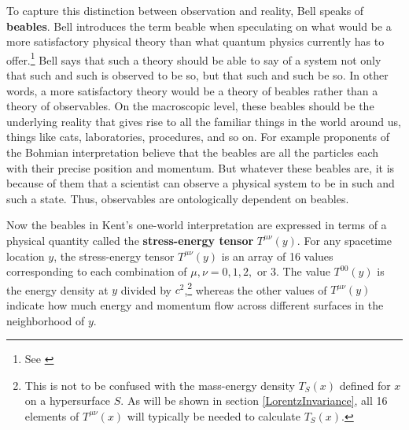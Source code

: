 \documentclass[12pt]{report}
\begin{document}
To capture this distinction between observation and reality, Bell speaks of \textbf{beables}.\label{beabledef} Bell introduces the term beable when speculating on what would be a more satisfactory physical theory than what quantum physics currently has to offer.\footnote{See \cite{Bell2}} Bell says that such a theory should be able to say of a system not only that such and such is observed to be so, but that such and such be so. In other words, a more satisfactory theory would be a theory of beables rather than a theory of observables. On the macroscopic level, these beables should be the underlying reality that gives rise to all the familiar things in the world around us, things like cats, laboratories, procedures, and so on. For example proponents of the Bohmian interpretation believe that the beables are all the particles each with their precise position and momentum. But whatever these beables are, it is because of them that a scientist can observe a physical system to be in such and such a state. Thus, observables are ontologically dependent on beables.   

Now the beables in Kent's one-world interpretation are expressed in terms of a physical quantity called the \textbf{stress-energy tensor}  $T^{\mu\nu}(y)$.\label{stressenergy}   %
%
For any spacetime location $y$, the stress-energy tensor $T^{\mu\nu}(y)$ is an array of 16 values corresponding to each combination of $\mu, \nu=0,1,2,$ or $3$. %
%
 The value $T^{00}(y)$ is the energy density at $y$ divided by $c^2$,\footnote{This is not to be confused with the mass-energy density $T_S(x)$ defined for $x$ on a hypersurface $S$. As will be shown in section \ref{LorentzInvariance},   all 16 elements of $T^{\mu\nu}(x)$ will typically be needed to calculate $T_S(x)$.} whereas the other values of $T^{\mu\nu}(y)$ indicate how much energy and momentum flow across different surfaces in the neighborhood of $y$. 
\end{document}
